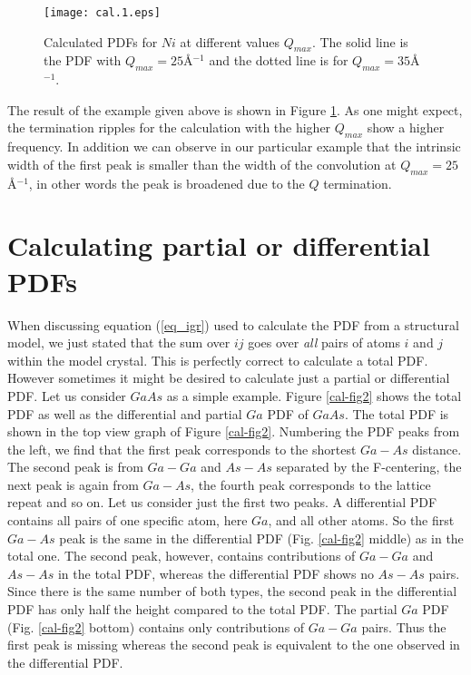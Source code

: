 \begin{figure}[!htb]
   \centering
   \texttt{[image: cal.1.eps]}
   \caption[Calculated PDFs for $Ni$ at different values $Q_{max}$]
           {Calculated PDFs for $Ni$ at different values $Q_{max}$.
            The solid line is the PDF with $Q_{max} = 25$\AA$^{-1}$ and
            the dotted line is for $Q_{max} = 35$\AA$^{-1}$.}
   \label{cal-fig1}
\end{figure}

The result of the example given above is shown in Figure \ref{cal-fig1}.
As one might expect, the termination ripples for the calculation with
the higher $Q_{max}$ show a higher frequency. In addition we can observe
in our particular example that the intrinsic width of the first peak
is smaller than the width of the convolution at $Q_{max}=25$\AA$^{-1}$,
in other words the peak is broadened due to the $Q$ termination.

\section{Calculating partial or differential PDFs \label{calc_partial}}

When discussing equation (\ref{eq_igr}) used to calculate the PDF from
a structural model, we just stated that the sum over $ij$ goes over
{\it all} pairs of atoms $i$ and $j$ within the model crystal. This
is perfectly correct to calculate a total PDF. However sometimes it
might be desired to calculate just a partial or differential PDF. Let
us consider $GaAs$ as a simple example. Figure \ref{cal-fig2} shows
the total PDF as well as the differential and partial $Ga$ PDF of
$GaAs$. The total PDF is shown in the top view graph of Figure
\ref{cal-fig2}. Numbering the PDF peaks from the left, we find that
the first peak corresponds to the shortest $Ga-As$ distance. The second
peak is from $Ga-Ga$ and $As-As$ separated by the F-centering, the
next peak is again from $Ga-As$, the fourth peak corresponds to the
lattice repeat and so on. Let us consider just the first two peaks.
A differential PDF contains all pairs of one specific atom, here $Ga$,
and all other atoms. So the first $Ga-As$ peak is the same in the
differential PDF (Fig. \ref{cal-fig2} middle) as in the total one.
The second peak, however, contains contributions of $Ga-Ga$ and
$As-As$ in the total PDF, whereas the differential PDF shows no
$As-As$ pairs. Since there is the same number of both types, the second
peak in the differential PDF has only half the height compared to
the total PDF. The partial $Ga$ PDF (Fig. \ref{cal-fig2} bottom) contains
only contributions of $Ga-Ga$ pairs. Thus the first peak is missing
whereas the second peak is equivalent to the one observed in the
differential PDF. \par


